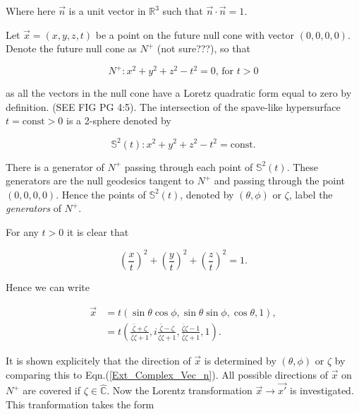 \noindent Where here $\vec{n}$ is a unit vector in $\mathbb{R}^3$ such that $\vec{n} \cdot \vec{n} = 1$.

Let $\vec{x} = (x,y,z,t)$ be a point on the future null cone with vector $(0,0,0,0)$. Denote the future null cone as $N^{+}$ (not sure???), so that 

\begin{equation*}
N^+ : x^2 + y^2 + z^2 - t^2 = 0 \text{,  for  } t>0
\end{equation*}

as all the vectors in the null cone have a Loretz quadratic form equal to zero by definition. (SEE FIG PG 4:5). The intersection of the spave-like hypersurface $t = \text{const}>0$ is a 2-sphere denoted by 

\begin{equation*}
\mathbb{S}^2 (t) : x^2 + y^2 + z^2 - t^2 = \text{const}.
\end{equation*}

\noindent There is a generator of $N^+$ passing through each point of $\mathbb{S}^2 (t)$. These generators are the null geodesics tangent to $N^+$ and passing through the point $(0,0,0,0)$. Hence the points of $\mathbb{S}^2 (t)$, denoted by $(\theta,\phi)$ or $\zeta$, label the \textit{generators} of $N^{+}$.

For any $t>0$ it is clear that

\begin{equation*}
\left(\frac{x}{t}\right)^2 +\left(\frac{y}{t}\right)^2 +\left(\frac{z}{t}\right)^2 = 1.
\end{equation*}

\noindent Hence we can write

\begin{eqnarray}\nonumber
\vec{x} & = t(\sin{\theta}\cos{\phi}, \sin{\theta}\sin{\phi}, \cos{\theta}, 1), \\\label{Ext_Complex_vec_x_relations}
        & = t\left( \frac{\bar{\zeta} + \zeta}{\bar{\zeta}\zeta + 1}  ,i\frac{\bar{\zeta} - \zeta}{\bar{\zeta}\zeta + 1}, \frac{\bar{\zeta}\zeta - 1}{\bar{\zeta}\zeta + 1},1  \right).
\end{eqnarray}

\noindent It is shown explicitely that the direction of $\vec{x}$ is determined by $(\theta,\phi)$ or $\zeta$ by comparing this to Eqn.(\ref{Ext_Complex_Vec_n}). All possible directions of $\vec{x}$ on $N^{+}$ are covered if $\zeta \in \hat{\mathbb{C}}$. Now the Lorentz transformation $\vec{x} \rightarrow \vec{x'}$ is investigated. This tranformation takes the form  

